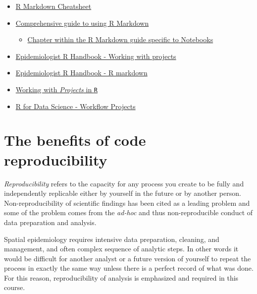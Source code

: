 \documentclass[
]{book}
\providecommand{\tightlist}{%
  \setlength{\itemsep}{0pt}\setlength{\parskip}{0pt}}
\begin{document}
\begin{itemize}
\tightlist
\item
  \href{https://github.com/rstudio/cheatsheets/raw/master/rmarkdown.pdf}{R Markdown Cheatsheet}
\item
  \href{https://bookdown.org/yihui/rmarkdown/}{Comprehensive guide to using R Markdown}

  \begin{itemize}
  \tightlist
  \item
    \href{https://bookdown.org/yihui/rmarkdown/notebook.html}{Chapter within the R Markdown guide specific to Notebooks}
  \end{itemize}
\item
  \href{https://epirhandbook.com/r-projects.html}{Epidemiologist R Handbook - Working with projects}
\item
  \href{https://epirhandbook.com/reports-with-r-markdown.html\#r-markdown-components}{Epidemiologist R Handbook - R markdown}
\item
  \href{https://support.rstudio.com/hc/en-us/articles/200526207-Using-Projects}{Working with \emph{Projects} in \texttt{R}}
\item
  \href{https://r4ds.had.co.nz/workflow-projects.html}{R for Data Science - Workflow Projects}
\end{itemize}

\hypertarget{the-benefits-of-code-reproducibility}{%
\section{The benefits of code reproducibility}\label{the-benefits-of-code-reproducibility}}

\emph{Reproducibility} refers to the capacity for any process you create to be fully and independently replicable either by yourself in the future or by another person. Non-reproducibility of scientific findings has been cited as a leading problem and some of the problem comes from the \emph{ad-hoc} and thus non-reproducible conduct of data preparation and analysis.

Spatial epidemiology requires intensive data preparation, cleaning, and management, and often complex sequence of analytic steps. In other words it would be difficult for another analyst or a future version of yourself to repeat the process in exactly the same way unless there is a perfect record of what was done. For this reason, reproducibility of analysis is emphasized and required in this course.
\end{document}
